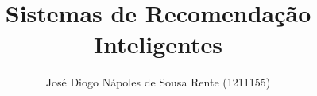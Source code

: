 
\hypersetup{
    hidelinks,
    bookmarksopen=true,
    bookmarksopenlevel=0,
    breaklinks=true,
}

\geometry{
	headheight=4ex,
	paper=a4paper,
	inner=3cm, %
	outer=3.5cm, %
	bindingoffset=.5cm, %
	top=3cm, %
	bottom=3cm, %
}


\setlength{\parindent}{0pt} %



\onehalfspacing{} %


\title{Sistemas de Recomendação Inteligentes}
\author{José Diogo Nápoles de Sousa Rente (1211155)}

\newcommand{\company}{DevScope}
\newcommand{\orientador}{Carlos Ramos (CSR)}
\newcommand{\supervisor}{David Mota}

\newcommand{\university}{Polit\'{e}cnico do Porto}
\newcommand{\school}{Instituto Superior de Engenharia do Porto}
\newcommand{\department}{Departamento de Engenharia Inform\'{a}tica}
\newcommand{\degree}{}
\newcommand{\degreeacrn}{LEI}
\newcommand{\frontcourselabel}{\large{} Licenciatura em Engenharia Inform\'atica}
\newcommand{\aftercourselabel}{}

